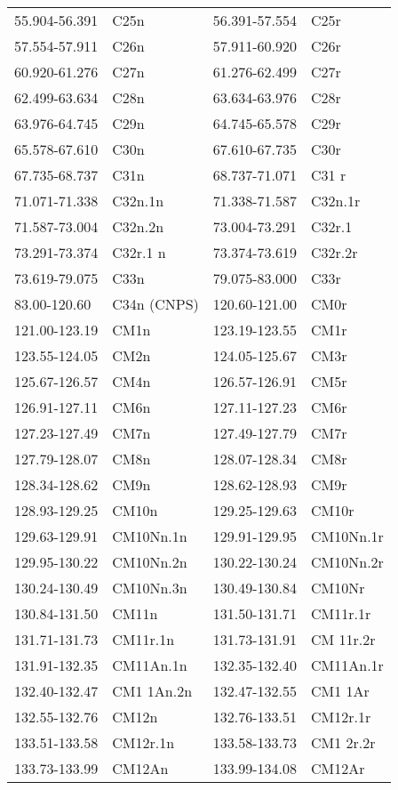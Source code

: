 \begin{center}
\begin{longtable}{ll|ll}
55.904-56.391 & C25n & 56.391-57.554 & C25r\\
57.554-57.911 & C26n & 57.911-60.920 & C26r\\
60.920-61.276 & C27n & 61.276-62.499 & C27r\\
62.499-63.634 & C28n & 63.634-63.976 & C28r\\
63.976-64.745 & C29n & 64.745-65.578 & C29r\\
65.578-67.610 & C30n & 67.610-67.735 & C30r\\
67.735-68.737 & C31n & 68.737-71.071 & C31 r\\
71.071-71.338 & C32n.1n & 71.338-71.587 & C32n.1r\\
71.587-73.004 & C32n.2n & 73.004-73.291 & C32r.1\\
73.291-73.374 & C32r.1 n & 73.374-73.619 & C32r.2r\\
73.619-79.075 & C33n & 79.075-83.000 & C33r\\
83.00-120.60 & C34n (CNPS) & 120.60-121.00 & CM0r\\
121.00-123.19 & CM1n & 123.19-123.55 & CM1r\\
123.55-124.05 & CM2n & 124.05-125.67 & CM3r\\
125.67-126.57 & CM4n & 126.57-126.91 & CM5r\\
126.91-127.11 & CM6n & 127.11-127.23 & CM6r\\
127.23-127.49 & CM7n & 127.49-127.79 & CM7r\\
127.79-128.07 & CM8n & 128.07-128.34 & CM8r\\
128.34-128.62 & CM9n & 128.62-128.93 & CM9r\\
128.93-129.25 & CM10n & 129.25-129.63 & CM10r\\
129.63-129.91 & CM10Nn.1n & 129.91-129.95 & CM10Nn.1r\\
129.95-130.22 & CM10Nn.2n & 130.22-130.24 & CM10Nn.2r\\
130.24-130.49 & CM10Nn.3n & 130.49-130.84 & CM10Nr\\
130.84-131.50 & CM11n & 131.50-131.71 & CM11r.1r\\
131.71-131.73 & CM11r.1n & 131.73-131.91 & CM 11r.2r\\
131.91-132.35 & CM11An.1n & 132.35-132.40 & CM11An.1r\\
132.40-132.47 & CM1 1An.2n & 132.47-132.55 & CM1 1Ar\\
132.55-132.76 & CM12n & 132.76-133.51 & CM12r.1r\\
133.51-133.58 & CM12r.1n & 133.58-133.73 & CM1 2r.2r\\
133.73-133.99 & CM12An & 133.99-134.08 & CM12Ar\\

\end{longtable}
\end{center}

